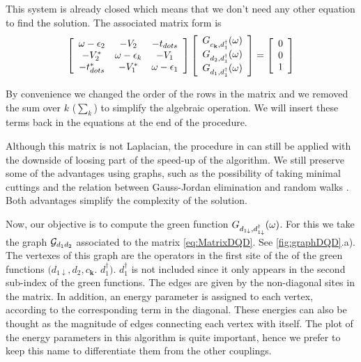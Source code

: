  This system is already closed which means that we don't need any other equation to find the solution. The associated matrix form is  \begin{equation}
\left[\begin{array}{ccc}
\omega-\epsilon_{2} & -V_{2} & -t_{dots}\\
-V_{2}^{*} & \omega-\epsilon_{k} & -V_{1}\\
-t_{dots}^{*} & -V_{1}^{*} & \omega-\epsilon_{1}
\end{array}\right]\left[\begin{array}{c}
G_{c_{\mathbf{k}},d_{1}^{\dagger}}(\omega)\\
G_{d_2,d_{1}^{\dagger}}(\omega)\\
G_{d_{1},d_{1}^{\dagger}}(\omega)
\end{array}\right]=\left[\begin{array}{c}
0\\
0\\
1
\end{array}\right]
\label{eq:MatrixDQD}
 \end{equation}
 
\noindent By convenience we changed the order of the rows in the matrix and we removed the sum over $k$ ($\sum_k$) to simplify the algebraic operation. We will insert these terms back in the equations at the end of the procedure.

Although this matrix is not Laplacian, the procedure in \cite{spielman10}  can still be applied with the downside of loosing part of the  speed-up of the algorithm. We still preserve  some of the advantages  using graphs, such as the possibility of taking minimal cuttings and the relation between Gauss-Jordan elimination and random walks \cite{spielman10}  . Both advantages simplify the complexity of the solution. 
 
Now, our objective is to compute the green function  $G_{d_{1\downarrow},d_{1\downarrow}^{\dagger}}(\omega)$.   For this we take the graph $\mathcal{G}_{d_1d_2}$ associated to the matrix  \eqref{eq:MatrixDQD}. See \ref{fig:graphDQD}.a).  The vertexes of this graph are the operators in the first site of the of the green functions  $(d_{1\downarrow},d_{2},c_{\boldsymbol{k}}$. $d_1^\dagger)$. $d^\dagger_1$ is not included since it only appears in the second sub-index of the green functions. The edges are given by the non-diagonal sites in the matrix. In addition, an energy parameter is assigned to each vertex, according to the corresponding term in the diagonal. These energies can also be thought as the magnitude of edges connecting each vertex with itself. The plot of the energy parameters in this algorithm is quite important, hence we prefer to keep this name to differentiate them from the other couplings.  

